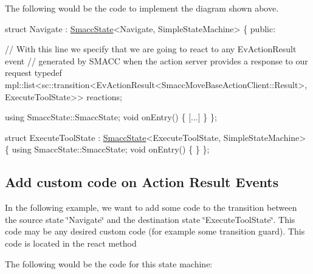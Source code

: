 

The following would be the code to implement the diagram shown above.


\begin{DoxyCode}
\textcolor{keyword}{struct }Navigate : \hyperlink{classSmaccState}{SmaccState}<Navigate, SimpleStateMachine>
\{
\textcolor{keyword}{public}:

  \textcolor{comment}{// With this line we specify that we are going to react to any EvActionResult event}
  \textcolor{comment}{// generated by SMACC when the action server provides a response to our request}
  \textcolor{keyword}{typedef} mpl::list<sc::transition<EvActionResult<SmaccMoveBaseActionClient::Result>, ExecuteToolState>> 
      reactions;

  \textcolor{keyword}{using} SmaccState::SmaccState;
  \textcolor{keywordtype}{void} onEntry()
  \{
   [...]
  \}
\};

\textcolor{keyword}{struct }ExecuteToolState : \hyperlink{classSmaccState}{SmaccState}<ExecuteToolState, SimpleStateMachine>
\{
    \textcolor{keyword}{using} SmaccState::SmaccState;
    \textcolor{keywordtype}{void} onEntry()
    \{
    \}
\};
\end{DoxyCode}


\subsection*{Add custom code on Action Result Events}

In the following example, we want to add some code to the transition between the source state \char`\"{}\+Navigate\char`\"{} and the destination state \char`\"{}\+Execute\+Tool\+State\char`\"{}. This code may be any desired custom code (for example some transition guard). This code is located in the react method

 

The following would be the code for this state machine\+:


